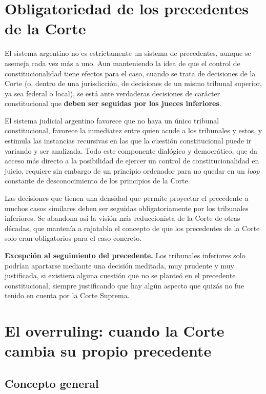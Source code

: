 \documentclass[12pt,oneside]{book}
\begin{document}
\section{Obligatoriedad de los precedentes de la Corte}

El sistema argentino no es estrictamente un sistema de precedentes, aunque se asemeja cada vez más a uno. Aun manteniendo la idea de que el control de constitucionalidad tiene efectos para el caso, cuando se trata de decisiones de la Corte (o, dentro de una jurisdicción, de decisiones de un mismo tribunal superior, ya sea federal o local), se está ante verdaderas decisiones de carácter constitucional que \textbf{deben ser seguidas por los jueces inferiores}.

El sistema judicial argentino favorece que no haya un único tribunal constitucional, favorece la inmediatez entre quien acude a los tribunales y estos, y estimula las instancias recursivas en las que la cuestión constitucional puede ir variando y ser analizada. Todo este componente dialógico y democrático, que da acceso más directo a la posibilidad de ejercer un control de constitucionalidad en juicio, requiere sin embargo de un principio ordenador para no quedar en un \textit{loop} constante de desconocimiento de los principios de la Corte.

Las decisiones que tienen una densidad que permite proyectar el precedente a muchos casos similares deben ser seguidas obligatoriamente por los tribunales inferiores. Se abandona así la visión más reduccionista de la Corte de otras décadas, que mantenía a rajatabla el concepto de que los precedentes de la Corte solo eran obligatorios para el caso concreto.

\begin{important}
\textbf{Excepción al seguimiento del precedente.} Los tribunales inferiores solo podrían apartarse mediante una decisión meditada, muy prudente y muy justificada, si existiera alguna cuestión que no se planteó en el precedente constitucional, siempre justificando que hay algún aspecto que quizás no fue tenido en cuenta por la Corte Suprema.
\end{important}

\section{El overruling: cuando la Corte cambia su propio precedente}

\subsection{Concepto general}
\end{document}
